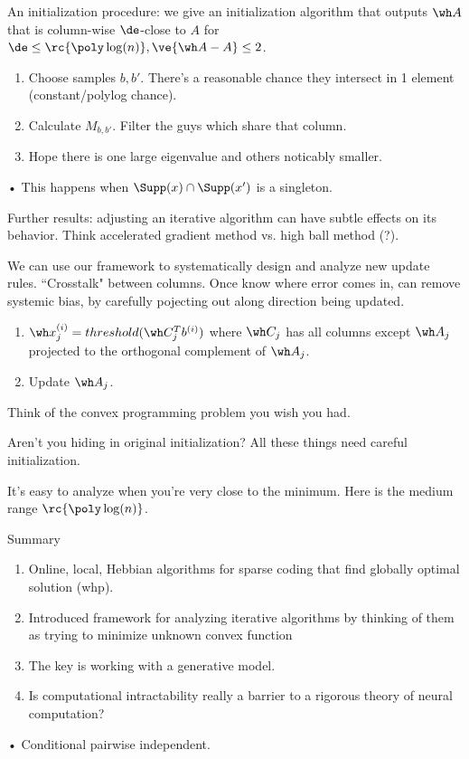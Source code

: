 An initialization procedure: we give an initialization algorithm that outputs $\wh A$ that is column-wise $\de$-close to $A$ for $\de\le \rc{\poly\log(n)}, \ve{\wh A-A}\le 2$. 
\begin{enumerate}
\item
Choose samples $b,b'$. There's a reasonable chance they intersect in 1 element (constant/polylog chance).
\item
Calculate $M_{b,b'}$. Filter the guys which share that column. 
\item
Hope there is one large eigenvalue and others noticably smaller.
\end{enumerate}•
This happens when $\Supp(x)\cap \Supp(x')$ is a singleton.

Further results: adjusting an iterative algorithm can have subtle effects on its behavior.  Think accelerated gradient method vs. high ball method (?).

We can use our framework to systematically design and analyze new update rules. ``Crosstalk" between columns. Once know where error comes in, can remove systemic bias, by carefully pojecting out along direction being updated.
\begin{enumerate}
\item
$\wh x_j^{(i)} = threshold(\wh C_j^Tb^{(i)})$ where $\wh C_j$ has all columns except $\wh A_j$ projected to the orthogonal complement of $\wh A_j$.
\item
Update $\wh A_j$.
\end{enumerate}
Think of the convex programming problem you wish you had.

Aren't you hiding in original initialization? All these things need careful initialization.

It's easy to analyze when you're very close to the minimum. Here is the medium range $\rc{\poly\log(n)}$. 

Summary
\begin{enumerate}
\item
Online, local, Hebbian algorithms for sparse coding that find globally optimal solution (whp).
\item
Introduced framework for analyzing iterative algorithms by thinking of them as trying to minimize unknown convex function
\item
The key is working with a generative model.
\item Is computational intractability really a barrier to a rigorous theory of neural computation?
\end{enumerate}•
Conditional pairwise independent.

